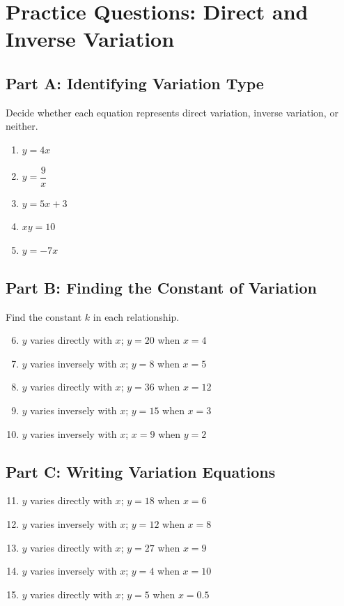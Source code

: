 \documentclass[14pt]{extarticle}
\begin{document}
\newpage


\section*{Practice Questions: Direct and Inverse Variation}

\subsection*{Part A: Identifying Variation Type}
Decide whether each equation represents direct variation, inverse variation, or neither.
\begin{enumerate}
  \item \(y = 4x\)
  \item \(y = \dfrac{9}{x}\)
  \item \(y = 5x + 3\)
  \item \(xy = 10\)
  \item \(y = -7x\)
\end{enumerate}

\subsection*{Part B: Finding the Constant of Variation}
Find the constant \(k\) in each relationship.
\begin{enumerate}
  \setcounter{enumi}{5}
  \item \(y\) varies directly with \(x\); \(y = 20\) when \(x = 4\)
  \item \(y\) varies inversely with \(x\); \(y = 8\) when \(x = 5\)
  \item \(y\) varies directly with \(x\); \(y = 36\) when \(x = 12\)
  \item \(y\) varies inversely with \(x\); \(y = 15\) when \(x = 3\)
  \item \(y\) varies inversely with \(x\); \(x = 9\) when \(y = 2\)
\end{enumerate}

\subsection*{Part C: Writing Variation Equations}
\begin{enumerate}
  \setcounter{enumi}{10}
  \item \(y\) varies directly with \(x\); \(y = 18\) when \(x = 6\)
  \item \(y\) varies inversely with \(x\); \(y = 12\) when \(x = 8\)
  \item \(y\) varies directly with \(x\); \(y = 27\) when \(x = 9\)
  \item \(y\) varies inversely with \(x\); \(y = 4\) when \(x = 10\)
  \item \(y\) varies directly with \(x\); \(y = 5\) when \(x = 0.5\)
\end{enumerate}
\end{document}
